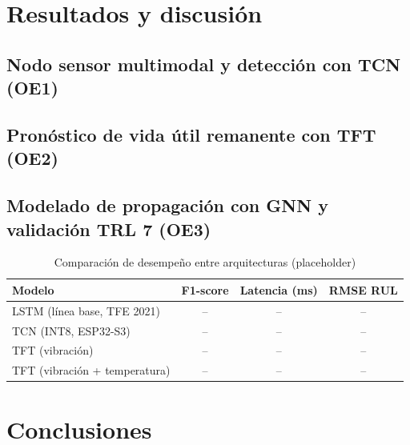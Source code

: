 \documentclass[11pt]{article}
\begin{document}
\section{Resultados y discusión}
\label{sec:resultados}

\subsection{Nodo sensor multimodal y detección con TCN (OE1)}

\subsection{Pronóstico de vida útil remanente con TFT (OE2)}

\subsection{Modelado de propagación con GNN y validación TRL 7 (OE3)}

\begin{table}[htb]
\begin{center}
\renewcommand\arraystretch{1.3}
\centering
\begin{tabular}{l c c c}
\toprule
Modelo & F1-score & Latencia (ms) & RMSE RUL \\
\midrule
LSTM (línea base, TFE 2021) & -- & -- & -- \\
TCN (INT8, ESP32-S3) & -- & -- & -- \\
TFT (vibración) & -- & -- & -- \\
TFT (vibración + temperatura) & -- & -- & -- \\
\bottomrule
\end{tabular}
\caption{Comparación de desempeño entre arquitecturas (placeholder)}
\label{tab:resultados-comparativos}
\end{center}
\end{table}

\section{Conclusiones}
\label{sec:conclusiones}


\newpage
\nocite{*} %

\end{document}
